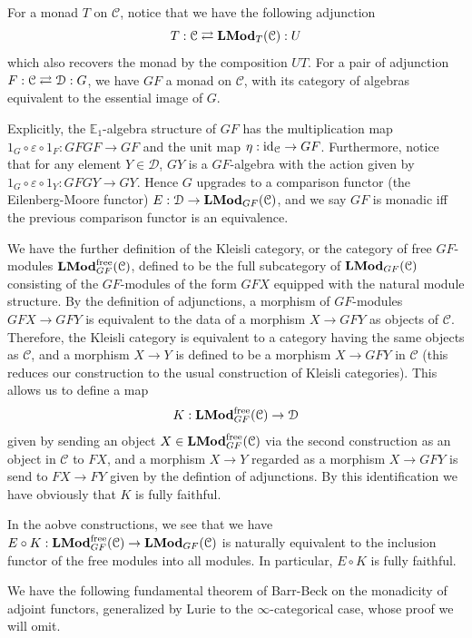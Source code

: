 	\begin{const}\label{Adj_EM_K_fun_defn}
		For a monad $T$ on $\mathcal{C}$, notice that we have the following adjunction 
		\[ T:\mathcal{C}\rightleftarrows\mathbf{LMod}_T(\mathcal{C}):U \]
		which also recovers the monad by the composition $UT$.  
		For a pair of adjunction $F:\mathcal{C}\rightleftarrows\mathcal{D}:G$, we have $GF$ a monad on $\mathcal{C}$, with its category of algebras equivalent to the essential image of $G$. 

		Explicitly, the $\mathbb{E}_1$-algebra structure of $GF$ has the multiplication map $1_G\circ\varepsilon\circ 1_F:GFGF\to GF$ and the unit map $\eta:\operatorname{\mathrm{id}}_\mathcal{C}\to GF$. Furthermore, notice that for any element $Y\in\mathcal{D}$, $GY$ is a $GF$-algebra with the action given by $1_G\circ\varepsilon\circ 1_Y:GFGY\to GY$. Hence $G$ upgrades to a comparison functor (the Eilenberg-Moore functor) $E:\mathcal{D}\to\mathbf{LMod}_{GF}(\mathcal{C})$, and we say $GF$ is monadic iff the previous comparison functor is an equivalence. 

		We have the further definition of the Kleisli category, or the category of free $GF$-modules $\mathbf{LMod}_{GF}^{\mathrm{free}}(\mathcal{C})$, defined to be the full subcategory of $\mathbf{LMod}_{GF}(\mathcal{C})$ consisting of the $GF$-modules of the form $GFX$ equipped with the natural module structure. By the definition of adjunctions, a morphism of $GF$-modules $GFX\to GFY$ is equivalent to the data of a morphism $X\to GFY$ as objects of $\mathcal{C}$. Therefore, the Kleisli category is equivalent to a category having the same objects as $\mathcal{C}$, and a morphism $X\to Y$ is defined to be a morphism $X\to GFY$ in $\mathcal{C}$ (this reduces our construction to the usual construction of Kleisli categories). This allows us to define a map 
		\[ K:\mathbf{LMod}_{GF}^{\mathrm{free}}(\mathcal{C})\to\mathcal{D} \] 
		given by sending an object $X\in\mathbf{LMod}_{GF}^{\mathrm{free}}(\mathcal{C})$ via the second construction as an object in $\mathcal{C}$ to $FX$, and a morphism $X\to Y$ regarded as a morphism $X\to GFY$ is send to $FX\to FY$ given by the defintion of adjunctions. By this identification we have obviously that $K$ is fully faithful. 

		In the aobve constructions, we see that we have $E\circ K:\mathbf{LMod}_{GF}^{\mathrm{free}}(\mathcal{C})\to\mathbf{LMod}_{GF}(\mathcal{C})$ is naturally equivalent to the inclusion functor of the free modules into all modules. In particular, $E\circ K$ is fully faithful. 
	\end{const}

	We have the following fundamental theorem of Barr-Beck on the monadicity of adjoint functors, generalized by Lurie to the $\infty$-categorical case, whose proof we will omit. 

